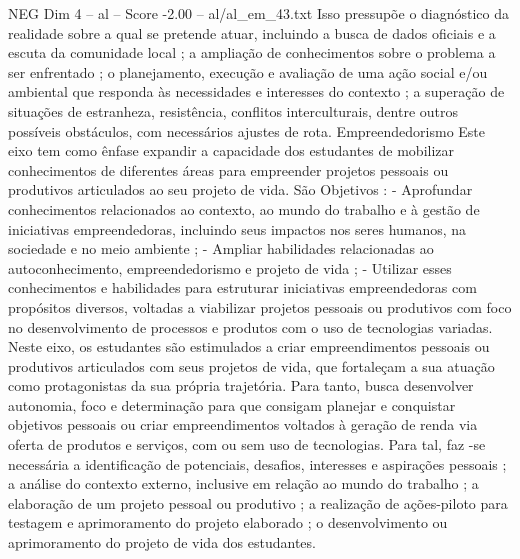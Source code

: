 \begin{textsample}{NEG Dim 4 – al – Score -2.00 – al/al\_em\_43.txt}
Isso pressupõe o diagnóstico da realidade sobre a qual se pretende atuar, incluindo a busca de dados oficiais e a escuta da comunidade local ; a ampliação de conhecimentos sobre o problema a ser enfrentado ; o planejamento, execução e avaliação de uma ação social e/ou ambiental que responda às necessidades e interesses do contexto ; a superação de situações de estranheza, resistência, conflitos interculturais, dentre outros possíveis obstáculos, com necessários ajustes de rota.
Empreendedorismo Este eixo tem como ênfase expandir a capacidade dos estudantes de mobilizar conhecimentos de diferentes áreas para empreender projetos pessoais ou produtivos articulados ao seu projeto de vida.
São Objetivos : - Aprofundar conhecimentos relacionados ao contexto, ao mundo do trabalho e à gestão de iniciativas empreendedoras, incluindo seus impactos nos seres humanos, na sociedade e no meio ambiente ; - Ampliar habilidades relacionadas ao autoconhecimento, empreendedorismo e projeto de vida ; - Utilizar esses conhecimentos e habilidades para estruturar iniciativas empreendedoras com propósitos diversos, voltadas a viabilizar projetos pessoais ou produtivos com foco no desenvolvimento de processos e produtos com o uso de tecnologias variadas.
Neste eixo, os estudantes são estimulados a criar empreendimentos pessoais ou produtivos articulados com seus projetos de vida, que fortaleçam a sua atuação como protagonistas da sua própria trajetória.
Para tanto, busca desenvolver autonomia, foco e determinação para que consigam planejar e conquistar objetivos pessoais ou criar empreendimentos voltados à geração de renda via oferta de produtos e serviços, com ou sem uso de tecnologias.
Para tal, faz -se necessária a identificação de potenciais, desafios, interesses e aspirações pessoais ; a análise do contexto externo, inclusive em relação ao mundo do trabalho ; a elaboração de um projeto pessoal ou produtivo ; a realização de ações-piloto para testagem e aprimoramento do projeto elaborado ; o desenvolvimento ou aprimoramento do projeto de vida dos estudantes.

\end{textsample}
